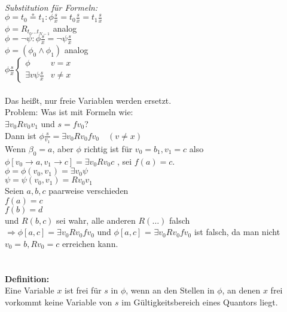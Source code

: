 \documentclass[a4paper]{scrartcl}
\begin{document}
		\textit{Substitution für Formeln:}\\
			$\phi = t_0 \circeq t_1: \phi \frac{s}{x} = t_0 \frac{s}{x} =t_1 \frac{s}{x}$\medskip\\
			$\phi= R_{t_{0} \dots t_{N-1}}$ analog \medskip\\
			$\phi = \lnot \psi:\phi\frac{s}{x} = \lnot \psi \frac{s}{x}$\medskip\\
			$\phi = (\phi_0 \wedge \phi_1)$ analog \medskip \\
			$\phi \frac{s}{x}  \begin{cases}  \phi&  v=x\\
												\exists v\psi \frac{s}{x} &  v\neq x
										\end{cases} $\\\\
			Das heißt, nur freie Variablen werden ersetzt.\medskip\\
			Problem: Was ist mit Formeln wie:\medskip\\				
			$\exists v_0 Rv_0 v_1$ und $s=fv_0$?\medskip\\
			Dann ist $\phi \frac{s}{v_1} = \exists v_0 Rv_0 fv_0 \quad (v \neq x)$ \\
			Wenn $\beta_0 = a$, aber $\phi$ richtig ist für $v_0 = b_1,v_1 = c$ also $\phi \left[ v_0 \rightarrow a, v_1 \rightarrow c\right] = \exists v_0 R v_0 c$ , sei $f(a)=c$. \bigskip\\
			$\phi = \phi (v_0, v_1) = \exists v_0 \psi$ \\
			$\psi = \psi (v_0, v_1) = R v_0 v_1$ \\
			Seien $a,b,c$ paarweise verschieden\\
			$f(a) = c $\\
			$f(b) = d $\\
			und $R(b,c)$ sei wahr, alle anderen $R(\dots)$ falsch\\
			$\Rightarrow \phi \left[ a, c\right] = \exists v_0Rv_0fv_0$ und $\phi \left[ a, c \right]$  = $\exists v_0 R v_0 f v_0$ ist falsch, da man nicht $v_0 = b, R v_0 = c$ erreichen kann.\\\\\\
			
		\textbf{Definition:} \\
			Eine Variable $x$ ist frei für $s$ in $\phi$, wenn an den Stellen in $\phi$, an denen $x$ frei vorkommt keine Variable von $s$ im Gültigkeitsbereich eines Quantors liegt.\\\\
			
\end{document}
